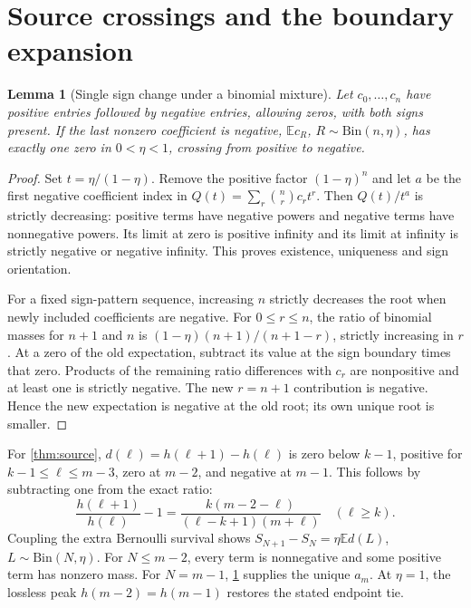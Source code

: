 \documentclass[11pt,a4paper]{article}
\newtheorem{lemma}[theorem]{Lemma}
\theoremstyle{remark}\newtheorem{remark}[theorem]{Remark}
\newcommand{\E}{\mathbb E}
\begin{document}
\section{Source crossings and the boundary expansion}\label{app:source}
\begin{lemma}[Single sign change under a binomial mixture]\label{lem:crossing}
Let $c_0,\ldots,c_n$ have positive entries followed by negative entries, allowing zeros, with both signs present. If the last nonzero coefficient is negative, $\E c_R$, $R\sim\mathrm{Bin}(n,\eta)$, has exactly one zero in $0<\eta<1$, crossing from positive to negative.
\end{lemma}
\begin{proof}
Set $t=\eta/(1-\eta)$. Remove the positive factor $(1-\eta)^n$ and let $a$ be the first negative coefficient index in $Q(t)=\sum_r\binom nr c_rt^r$. Then $Q(t)/t^a$ is strictly decreasing: positive terms have negative powers and negative terms have nonnegative powers. Its limit at zero is positive infinity and its limit at infinity is strictly negative or negative infinity. This proves existence, uniqueness and sign orientation.

For a fixed sign-pattern sequence, increasing $n$ strictly decreases the root when newly included coefficients are negative. For $0\le r\le n$, the ratio of binomial masses for $n+1$ and $n$ is $(1-\eta)(n+1)/(n+1-r)$, strictly increasing in $r$. At a zero of the old expectation, subtract its value at the sign boundary times that zero. Products of the remaining ratio differences with $c_r$ are nonpositive and at least one is strictly negative. The new $r=n+1$ contribution is negative. Hence the new expectation is negative at the old root; its own unique root is smaller.
\end{proof}

For \cref{thm:source}, $d(\ell)=h(\ell+1)-h(\ell)$ is zero below $k-1$, positive for $k-1\le\ell\le m-3$, zero at $m-2$, and negative at $m-1$. This follows by subtracting one from the exact ratio:
\begin{equation}
 \frac{h(\ell+1)}{h(\ell)}-1=\frac{k(m-2-\ell)}{(\ell-k+1)(m+\ell)}\quad(\ell\ge k).
\end{equation}
Coupling the extra Bernoulli survival shows $S_{N+1}-S_N=\eta\E d(L)$, $L\sim\mathrm{Bin}(N,\eta)$. For $N\le m-2$, every term is nonnegative and some positive term has nonzero mass. For $N=m-1$, \cref{lem:crossing} supplies the unique $a_m$. At $\eta=1$, the lossless peak $h(m-2)=h(m-1)$ restores the stated endpoint tie.
\end{document}
